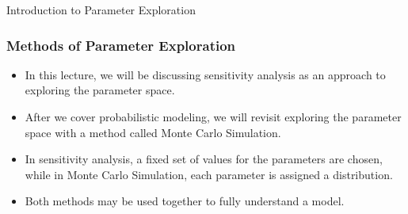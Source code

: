\documentclass[handout, 11pt]{beamer}
\begin{document}
\begin{section}{Introduction to Parameter Exploration}
\begin{frame}
\begin{center}
\begin{adjustbox}{width=0.9\textwidth, height=0.8\textheight, keepaspectratio}
\end{adjustbox}
\end{center}
\end{frame}
\begin{frame}
\frametitle{Methods of Parameter Exploration}
\begin{itemize}
\item In this lecture, we will be discussing sensitivity analysis as an approach to exploring the parameter space.
\vfill
\item After we cover probabilistic modeling, we will revisit exploring the parameter space with a method called Monte Carlo Simulation.
\vfill
\item In sensitivity analysis, a fixed set of values for the parameters are chosen, while in Monte Carlo Simulation, each parameter is assigned a distribution.
\vfill
\item Both methods may be used together to fully understand a model.
\end{itemize}
\end{frame}
\end{section}
\end{document}
